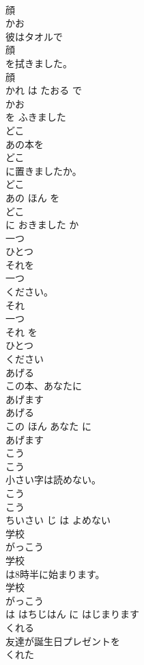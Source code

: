 \documentclass[8pt]{extreport}
\begin{document}
\begin{CJK}{UTF8}{min}
\\	顔	
\\	かお	
\\	彼はタオルで
\\	顔
\\	を拭きました。	
\\	顔 
\\	かれ は たおる で 
\\	かお
\\	を ふきました	
\\	どこ	
\\	あの本を
\\	どこ
\\	に置きましたか。	
\\	どこ 
\\	あの ほん を 
\\	どこ
\\	に おきました か	
\\	一つ	
\\	ひとつ	
\\	それを
\\	一つ
\\	ください。	
\\	それ 
\\	一つ 
\\	それ を 
\\	ひとつ
\\	ください	
\\	あげる	
\\	この本、あなたに
\\	あげます
\\	あげる 
\\	この ほん あなた に 
\\	あげます
\\	こう	
\\	こう
\\	小さい字は読めない。	
\\	こう 
\\	こう
\\	ちいさい じ は よめない	
\\	学校	
\\	がっこう	
\\	学校
\\	は8時半に始まります。	
\\	学校 
\\	がっこう
\\	は はちじはん に はじまります	
\\	くれる	
\\	友達が誕生日プレゼントを
\\	くれた

\end{CJK}
\end{document}
